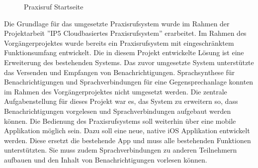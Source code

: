 \begin{figure}[h]
    \centering
    \begin{minipage}[b]{0.95\textwidth}
        \caption{Praxisruf Startseite}
    \end{minipage}
    \label{fig:AdminUI-Introduction}
\end{figure}

Die Grundlage für das umgesetzte Praxisrufsystem wurde im Rahmen der Projektarbeit ''IP5 Cloudbasiertes Praxisrufsystem'' erarbeitet.
Im Rahmen des Vorgängerprojektes wurde bereits ein Praxisrufsystem mit eingeschränktem Funktionsumfang entwickelt.
Die in diesem Projekt entwickelte Lösung ist eine Erweiterung des bestehenden Systems.
Das zuvor umgesetzte System unterstützte das Versenden und Empfangen von Benachrichtigungen.
Sprachsynthese für Benachrichtigungen und Sprachverbindungen für eine Gegensprechanlage konnten im Rahmen des Vorgängerprojektes nicht umgesetzt werden.\cite{ip5}
Die zentrale Aufgabenstellung für dieses Projekt war es, das System zu erweitern so, dass Benachrichtigungen vorgelesen und Sprachverbindungen aufgebaut werden können.
Die Bedienung des Praxisrufsystems soll weiterhin über eine mobile Applikation möglich sein.
Dazu soll eine neue, native iOS Applikation entwickelt werden.
Diese ersetzt die bestehende App und muss alle bestehenden Funktionen unterstützten.
Sie muss zudem Sprachverbindungen zu anderen Teilnehmern aufbauen und den Inhalt von Benachrichtigungen vorlesen können.

